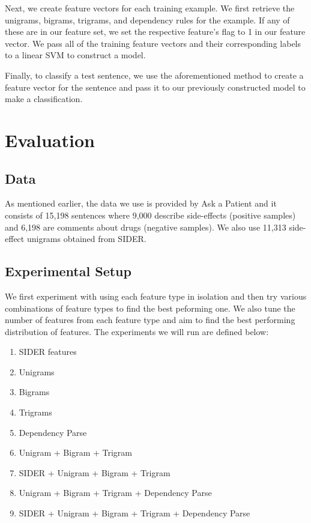 \documentclass{acm_proc_article-sp}
\begin{document}
Next, we create feature vectors for each training example. We first retrieve the unigrams, bigrams, trigrams, and dependency rules for the example. If any of these are in our feature set, we set the respective feature's flag to 1 in our feature vector. We pass all of the training feature vectors and their corresponding labels to a linear SVM to construct a model.

Finally, to classify a test sentence, we use the aforementioned method to create a feature vector for the sentence and pass it to our previously constructed model to make a classification. 

\section{Evaluation}
\vspace{2mm}
\subsection{Data}
As mentioned earlier, the data we use is provided by Ask a Patient and it consists of 15,198 sentences where 9,000 describe side-effects (positive samples) and 6,198 are comments about drugs (negative samples). We also use 11,313 side-effect unigrams obtained from SIDER.

\subsection{Experimental Setup}
We first experiment with using each feature type in isolation and then try various combinations of feature types to find the best peforming one. We also tune the number of features from each feature type and aim to find the best performing distribution of features. The experiments we will run are defined below:
\vspace{-3mm}
\begin{enumerate}
\setlength\itemsep{0.2em}
\item SIDER features
\item Unigrams
\item Bigrams
\item Trigrams
\item Dependency Parse 
\item Unigram + Bigram + Trigram
\item SIDER + Unigram + Bigram + Trigram
\item Unigram + Bigram + Trigram + Dependency Parse
\item SIDER + Unigram + Bigram + Trigram + Dependency Parse
\end{enumerate}
\end{document}
